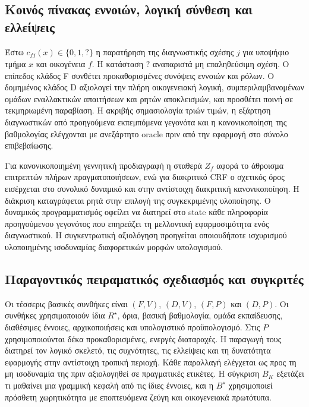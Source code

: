 \documentclass[11pt,a4paper]{article}
\begin{document}
\subsection{Κοινός πίνακας εννοιών, λογική σύνθεση και ελλείψεις}
Έστω $c_{fj}(x)\in\{0,1,?\}$ η παρατήρηση της διαγνωστικής σχέσης $j$ για υποψήφιο τμήμα $x$ και οικογένεια $f$. Η κατάσταση $?$ αναπαριστά μη επαληθεύσιμη σχέση. Ο επίπεδος κλάδος F συνθέτει προκαθορισμένες συνόψεις εννοιών και ρόλων. Ο δομημένος κλάδος D αξιολογεί την πλήρη οικογενειακή λογική, συμπεριλαμβανομένων ομάδων εναλλακτικών απαιτήσεων και ρητών αποκλεισμών, και προσθέτει ποινή σε τεκμηριωμένη παραβίαση. Η ακριβής σημασιολογία τριών τιμών, η εξάρτηση διαγνωστικών από προηγούμενα εκπεμπόμενα γεγονότα και η κανονικοποίηση της βαθμολογίας ελέγχονται με ανεξάρτητο oracle πριν από την εφαρμογή στο σύνολο επιβεβαίωσης.

Για κανονικοποιημένη γεννητική προδιαγραφή η σταθερά $Z_f$ αφορά το άθροισμα επιτρεπτών πλήρων πραγματοποιήσεων, ενώ για διακριτικό CRF ο σχετικός όρος εισέρχεται στο συνολικό δυναμικό και στην αντίστοιχη διακριτική κανονικοποίηση. Η διάκριση καταγράφεται ρητά στην επιλογή της συγκεκριμένης υλοποίησης. Ο δυναμικός προγραμματισμός οφείλει να διατηρεί στο state κάθε πληροφορία προηγούμενου γεγονότος που επηρεάζει τη μελλοντική εφαρμοσιμότητα ενός διαγνωστικού. Η συγκεντρωτική αξιολόγηση προηγείται οποιουδήποτε ισχυρισμού υλοποιημένης ισοδυναμίας διαφορετικών μορφών υπολογισμού.

\subsection{Παραγοντικός πειραματικός σχεδιασμός και συγκριτές}
Οι τέσσερις βασικές συνθήκες είναι $(F,V)$, $(D,V)$, $(F,P)$ και $(D,P)$. Οι συνθήκες χρησιμοποιούν ίδια $R^\star$, όρια, βασική βαθμολογία, ομάδα εκπαίδευσης, διαθέσιμες έννοιες, αρχικοποιήσεις και υπολογιστικό προϋπολογισμό. Στις $P$ χρησιμοποιούνται δέκα προκαθορισμένες, ενεργές διαταραχές. Η παραγωγή τους διατηρεί τον λογικό σκελετό, τις συχνότητες, τις ελλείψεις και τη δυνατότητα εφαρμογής στην αντίστοιχη τροπική περιοχή. Κάθε παραλλαγή ελέγχεται ως προς τη μη ισοδυναμία της πριν αξιολογηθεί σε πραγματικές ετικέτες. Η σύγκριση $B_K$ εξετάζει τι μαθαίνει μια γραμμική κεφαλή από τις ίδιες έννοιες, και η $B^\star$ χρησιμοποιεί πρόσθετη χωρητικότητα με εποπτευόμενα ζεύγη και οικογενειακά πρωτότυπα.
\end{document}
